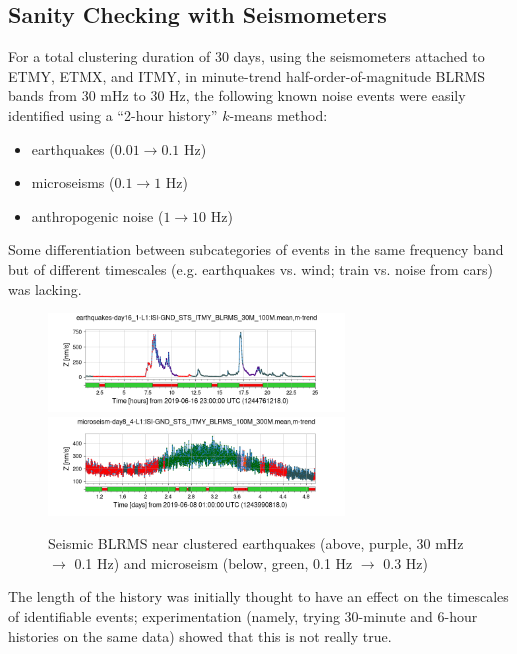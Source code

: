\documentclass[colorlinks=true,pdfstartview=FitV,linkcolor=blue,
            citecolor=red,urlcolor=magenta]{ligodoc}
\begin{document}
\subsection{Sanity Checking with Seismometers}
For a total clustering duration of 30 days, using the seismometers attached to ETMY, ETMX, and ITMY, in minute-trend half-order-of-magnitude BLRMS bands from 30 mHz to 30 Hz, the following known noise events were easily identified using a ``2-hour history'' $k$-means method:
\begin{itemize}
\item earthquakes ($0.01\to0.1$ Hz)
\item microseisms ($0.1\to1$ Hz)
\item anthropogenic noise ($1\to10$ Hz)
\end{itemize}

Some differentiation between subcategories of events in the same frequency band but of different timescales (e.g. earthquakes vs. wind; train vs. noise from cars) was lacking.

\begin{figure}[h]\hspace{-2ex}
  \includegraphics[width=0.7\textwidth]{assets/final/earthquakes-day16_1-L1:ISI-GND_STS_ITMY_BLRMS_30M_100Mmean,m-trend.png}
  \includegraphics[width=0.7\textwidth]{assets/final/microseism-day8_4-L1:ISI-GND_STS_ITMY_BLRMS_100M_300Mmean,m-trend.png}
  \caption{Seismic BLRMS near clustered earthquakes (above, purple, 30 mHz $\to$ 0.1 Hz) and microseism (below, green, 0.1 Hz $\to$ 0.3 Hz)}
\end{figure}

The length of the history was initially thought to have an effect on the timescales of identifiable events; experimentation (namely, trying 30-minute and 6-hour histories on the same data) showed that this is not really true.
\end{document}
